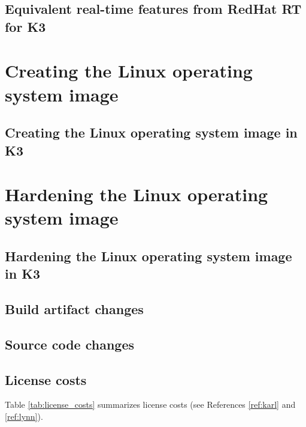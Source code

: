 \documentclass[12pt]{article}
\begin{document}
\subsection{Equivalent real-time features from RedHat RT for K3}

%
\newpage
\section{Creating the Linux operating system image}
\label{sec:image_creation}

\subsection{Creating the Linux operating system image in K3}


%
\newpage
\section{Hardening the Linux operating system image}
\label{sec:image_hardening}

\subsection{Hardening the Linux operating system image in K3}


%


\subsection{Build artifact changes}


\subsection{Source code changes}


\subsection{License costs}

Table \ref{tab:license_costs} summarizes license costs (see References \ref{ref:karl} and \ref{ref:lynn}).
\end{document}
